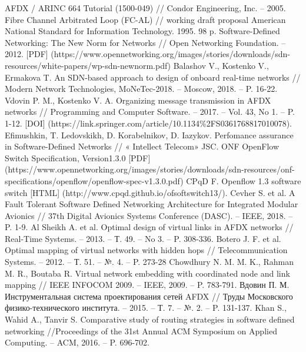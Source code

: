 \documentclass[12pt, a4paper]{article}
\begin{document}
\renewcommand{\bibname}{Список литературы}
\addcontentsline{toc}{section}{\bibname}

\begin{thebibliography}{}
	AFDX / ARINC 664 Tutorial (1500-049) // Condor Engineering, Inc. -- 2005.
	Fibre Channel Arbitrated Loop (FC-AL) // working draft proposal American National Standard for Information Technology. 1995. 98 p.
	Software-Defined Networking: The New Norm for Networks // Open Networking Foundation. -- 2012. [PDF] (https://www.opennetworking.org/images/stories/downloads/sdn-resources/white-papers/wp-sdn-newnorm.pdf)
	Balashov V., Kostenko V., Ermakova T. An SDN-based approach to design of onboard real-time networks // Modern Network Technologies, MoNeTec-2018. -- Moscow, 2018. -- P. 16-22.
	Vdovin P. M., Kostenko V. A. Organizing message transmission in AFDX networks // Programming and Computer Software. -- 2017. -- Vol. 43, No 1. -- P. 1-12. [DOI] (https://link.springer.com/article/10.1134\%2FS0361768817010078).
	Efimushkin, T. Ledovskikh, D. Korabelnikov, D. Iazykov. Perfomance assurance in Software-Defined Networks // « Intellect Telecom» JSC.
	ONF OpenFlow Switch Specification, Version1.3.0 [PDF] (https://www.opennetworking.org/images/stories/downloads/sdn-resources/onf-specifications/openflow/openflow-spec-v1.3.0.pdf)
	CPqD F. Openflow 1.3 software switch [HTML] (http://www.cpqd.github.io/ofsoftswitch13/).
	Cevher S. et al. A Fault Tolerant Software Defined Networking Architecture for Integrated Modular Avionics // 37th Digital Avionics Systems Conference (DASC). -- IEEE, 2018. -- P. 1-9.
	Al Sheikh A. et al. Optimal design of virtual links in AFDX networks // Real-Time Systems. -- 2013. -- Т. 49. -- No 3. -- P. 308-336.
	Botero J. F. et al. Optimal mapping of virtual networks with hidden hops // Telecommunication Systems. -- 2012. -- Т. 51. -- №. 4. -- P. 273-28
	Chowdhury N. M. M. K., Rahman M. R., Boutaba R. Virtual network embedding with coordinated node and link mapping // IEEE INFOCOM 2009. -- IEEE, 2009. -- P. 783-791.
	Вдовин П. М. Инструментальная система проектирования сетей AFDX // Труды Московского физико-технического института. -- 2015. -- Т. 7. -- №. 2. -- P. 131-137.
	Khan S., Wahid A., Tanvir S. Comparative study of routing strategies in software defined networking //Proceedings of the 31st Annual ACM Symposium on Applied Computing. -- ACM, 2016. -- P. 696-702.

\end{thebibliography}
\end{document}

